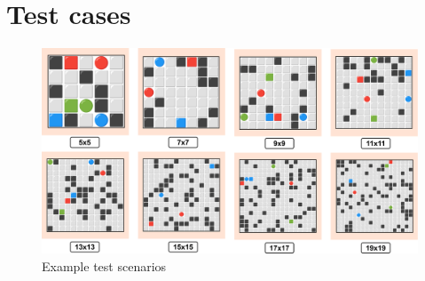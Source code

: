 \chapter{Test cases}
\label{sec:app_04}

\begin{figure}[H]
    \centering
    \includegraphics[width=\textwidth]{pictures/test_cases.png}
    \caption{Example test scenarios}
    \label{fig:test_cases}
\end{figure}